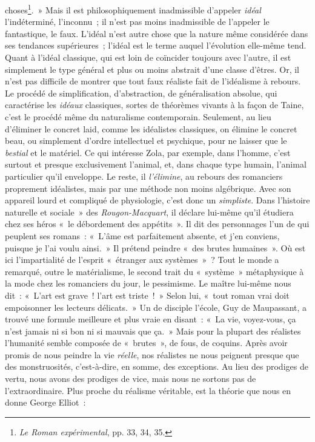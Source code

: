 \documentclass[french,twoside]{book} %
\begin{document}
choses\footnote{\emph{Le Roman expérimental}, pp. 33, 34, 35.}. » Mais il est philosophiquement inadmissible d’appeler \emph{idéal} l’indéterminé, l’inconnu ; il n’est pas moins inadmissible de l’appeler le fantastique, le faux. L’idéal n’est autre chose que la nature même considérée dans ses tendances supérieures ; l’idéal est le terme auquel l’évolution elle-même tend. Quant à l’idéal classique, qui est loin de coïncider toujours avec l’autre, il est simplement le type général et plus ou moins abstrait d’une classe d’êtres. Or, il n’est pas difficile de montrer que tout faux réaliste fait de l’idéalisme à rebours. Le procédé de simplification, d’abstraction, de généralisation absolue, qui caractérise les \emph{idéaux} classiques, sortes de théorèmes vivants à la façon de Taine, c’est le procédé même du naturalisme contemporain. Seulement, au lieu d’éliminer le concret laid, comme les idéalistes classiques, on élimine le concret beau, ou simplement d’ordre intellectuel et psychique, pour ne laisser que le \emph{bestial} et le matériel. Ce qui intéresse Zola, par exemple, dans l’homme, c’est surtout et presque exclusivement l’animal, et, dans chaque type humain, l’animal particulier qu’il enveloppe. Le reste, il \emph{l’élimine}, au rebours des romanciers proprement idéalistes, mais par une méthode non moins algébrique. Avec son appareil lourd et compliqué de physiologie, c’est donc un \emph{simpliste}. Dans l’histoire naturelle et sociale » des \emph{Rougon-Macquart}, il déclare lui-même qu’il étudiera chez ses héros « le débordement des appétits ». Il dit des personnages l’un de qui peuplent ses romans : « L’âme est parfaitement absente, et j’en conviens, puisque je l’ai voulu ainsi. » Il prétend peindre « des brutes humaines ». Où est ici l’impartialité de l’esprit « étranger aux systèmes » ? Tout le monde a remarqué, outre le matérialisme, le second trait du « système » métaphysique à la mode chez les romanciers du jour, le pessimisme. Le maître lui-même nous dit : « L’art est grave ! l’art est triste ! » Selon lui, « tout roman vrai doit empoisonner les lecteurs délicats. » Un de disciple l’école, Guy de Maupassant, a trouvé une formule meilleure et plus vraie en disant : « La vie, voyez-vous, ça n’est jamais ni si bon ni si mauvais que ça. » Mais pour la plupart des réalistes l’humanité semble composée de « brutes », de fous, de coquins. Après avoir promis de nous peindre la vie \emph{réelle}, nos réalistes ne nous peignent presque que des monstruosités, c’est-à-dire, en somme, des exceptions. Au lieu des prodiges de vertu, nous avons des prodiges de vice, mais nous ne sortons pas de l’extraordinaire. Plus proche du réalisme véritable, est la théorie que nous en donne George Elliot :\par
\end{document}
